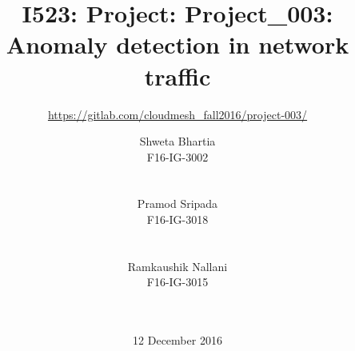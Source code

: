 \documentclass{acm_proc_article-sp}
\begin{document}
\title{I523: Project: Project\_003: Anomaly detection in network traffic}

\subtitle{\url{https://gitlab.com/cloudmesh\_fall2016/project-003/}}

\author{
\alignauthor
Shweta Bhartia\\
F16-IG-3002\\
       \\
       \\
\alignauthor
Pramod Sripada\\
F16-IG-3018\\
       \\
       \\
\alignauthor
Ramkaushik Nallani\\
F16-IG-3015\\
       \\
       \\
}

\date{12 December 2016}
\end{document}
